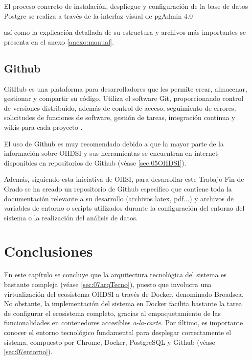 El proceso concreto de instalación, despliegue y configuración de la base de datos Postgre se realiza a través de la interfaz visual de pgAdmin 4.0 \cite{pgAdminWebsite}

así como la explicación detallada de su estructura y archivos más importantes se presenta en el anexo \ref{anexo:manual}.

\subsection{Github}

GitHub es una plataforma para desarrolladores que les permite crear, almacenar, gestionar y compartir su código. Utiliza el software Git, proporcionando control de versiones distribuido, además de control de acceso, seguimiento de errores, solicitudes de funciones de software, gestión de tareas, integración continua y wikis para cada proyecto \cite{GithubWikipedia}.

El uso de Github es muy recomendado debido a que la mayor parte de la información sobre OHDSI y sus herramientas se encuentran en internet disponibles en repositorios de Github (véase \ref{sec:05OHDSI}). 

Además, siguiendo esta iniciativa de OHSI, para desarrollar este Trabajo Fin de Grado se ha creado un repositorio de Github específico \cite{vallealonsodc} que contiene toda la documentación relevante a su desarrollo (archivos latex, pdf...) y archivos de variables de entorno o scripts utilizados durante la configuración del entorno del sistema o la realización del análisis de datos.   

\section{Conclusiones}

En este capítulo se concluye que la arquitectura tecnológica del sistema es bastante compleja (véase \ref{sec:07arqTecno}), puesto que involucra una virtualización del ecosistema OHDSI a través de Docker, denominado Broadsea. No obstante, la implementación del sistema en Docker facilita bastante la tarea de configurar el ecosistema completo, gracias al empaquetamiento de las funcionalidades en contenedores accesibles \textit{a-la-carte}. Por último, es importante conocer el entorno tecnológico fundamental para desplegar correctamente el sistema, compuesto por Chrome, Docker, PostgreSQL y Github (véase \ref{sec:07entorno}).